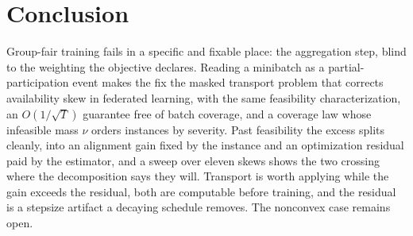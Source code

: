\documentclass{article}
\theoremstyle{definition}
\begin{document}
\section{Conclusion}

Group-fair training fails in a specific and fixable place: the aggregation step,
blind to the weighting the objective declares. Reading a minibatch as a
partial-participation event makes the fix the masked transport problem that
corrects availability skew in federated learning, with the same feasibility
characterization, an $O(1/\sqrt{T})$ guarantee free of batch coverage, and a
coverage law whose infeasible mass $\nu$ orders instances by severity. Past
feasibility the excess splits cleanly, into an alignment gain fixed by the
instance and an optimization residual paid by the estimator, and a sweep over
eleven skews shows the two crossing where the decomposition says they will. Transport is
worth applying while the gain exceeds the residual, both are computable before
training, and the residual is a stepsize artifact a decaying schedule removes.
The nonconvex case remains open.

\clearpage
\renewcommand{\refname}{REFERENCES}
\end{document}
